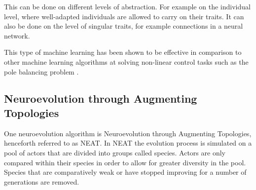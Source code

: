 This can be done on different levels of abstraction. For example on the individual level, where well-adapted individuals are allowed to carry on their traits. It can also be done on the level of singular traits, for example connections in a neural network.

This type of machine learning has been shown to be effective in comparison to other machine learning algorithms at solving non-linear control tasks such as the pole balancing problem \cite{gomez:efficient_nonlinear_control}.

\subsection{Neuroevolution through Augmenting Topologies}
One neuroevolution algorithm is Neuroevolution through Augmenting Topologies, henceforth referred to as NEAT. In NEAT the evolution process is simulated on a pool of actors that are divided into groups called species. Actors are only compared within their species in order to allow for greater diversity in the pool. Species that are comparatively weak or have stopped improving for a number of generations are removed.  









